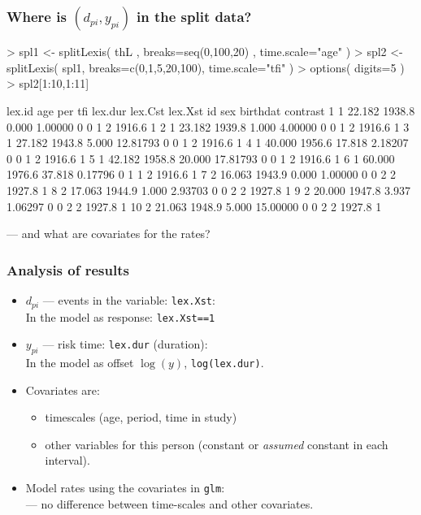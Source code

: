 \begin{frame}[fragile]
  \frametitle{Where is $(d_{pi},y_{pi})$ in the split data?}
\begin{Schunk}
\begin{Sinput}
> spl1 <- splitLexis( thL , breaks=seq(0,100,20)  , time.scale="age" )
> spl2 <- splitLexis( spl1, breaks=c(0,1,5,20,100), time.scale="tfi" )
> options( digits=5 )
> spl2[1:10,1:11]
\end{Sinput}
\begin{Soutput}
   lex.id    age    per    tfi  lex.dur lex.Cst lex.Xst id sex birthdat contrast
1       1 22.182 1938.8  0.000  1.00000       0       0  1   2   1916.6        1
2       1 23.182 1939.8  1.000  4.00000       0       0  1   2   1916.6        1
3       1 27.182 1943.8  5.000 12.81793       0       0  1   2   1916.6        1
4       1 40.000 1956.6 17.818  2.18207       0       0  1   2   1916.6        1
5       1 42.182 1958.8 20.000 17.81793       0       0  1   2   1916.6        1
6       1 60.000 1976.6 37.818  0.17796       0       1  1   2   1916.6        1
7       2 16.063 1943.9  0.000  1.00000       0       0  2   2   1927.8        1
8       2 17.063 1944.9  1.000  2.93703       0       0  2   2   1927.8        1
9       2 20.000 1947.8  3.937  1.06297       0       0  2   2   1927.8        1
10      2 21.063 1948.9  5.000 15.00000       0       0  2   2   1927.8        1
\end{Soutput}
\end{Schunk}
--- and what are covariates for the rates?
\end{frame}

\begin{frame}[fragile]
  \frametitle{Analysis of results}
\begin{itemize}[<+->]
\item $d_{pi}$ --- events in the variable: \texttt{lex.Xst}:\\
     In the model as response: \texttt{lex.Xst==1}
\item $y_{pi}$ --- risk time: \texttt{lex.dur} (duration):\\
     In the model as offset $\log(y)$, \texttt{log(lex.dur)}.
\item Covariates are:
\begin{itemize}
\item timescales (age, period, time in study)
\item other variables for this person
(constant or {\em assumed} constant in each interval).
\end{itemize}
\item Model rates using the covariates in \texttt{glm}:\\
  --- no difference between time-scales and other covariates.
\end{itemize}
\end{frame}

